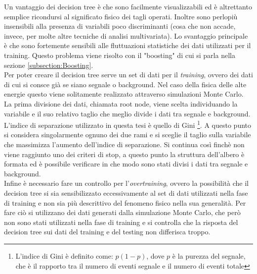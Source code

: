     Un vantaggio dei decision tree è che sono facilmente visualizzabili ed è altrettanto semplice ricondursi al significato fisico dei tagli operati. Inoltre sono perlopiù insensibili alla presenza di variabili poco discriminanti (cosa che non accade, invece, per molte altre tecniche di analisi multivariata). Lo svantaggio principale è che sono fortemente sensibili alle fluttuazioni statistiche dei dati utilizzati per il training. Questo problema viene risolto con il "boosting" di cui si parla nella sezione \ref{subsection:Boosting}.
    \\Per poter creare il decision tree serve un set di dati per il \textit{training}, ovvero dei dati di cui si consce già se siano segnale o background. Nel caso della fisica delle alte energie questo viene solitamente realizzato attraverso simulazioni Monte Carlo. La prima divisione dei dati, chiamata root node, viene scelta individuando la variabile e il suo relativo taglio che meglio divide i dati tra segnale e background. L'indice di separazione utilizzato in questa tesi è quello di Gini \footnote{L'indice di Gini è definito come: $p (1-p)$, dove $p$ è la purezza del segnale, che è il rapporto tra il numero di eventi segnale e il numero di eventi totale}. A questo punto si considera singolarmente ognuno dei due rami e si sceglie il taglio sulla variabile che massimizza l'aumento dell'indice di separazione. Si continua così finchè non viene raggiunto uno dei criteri di stop,  a questo punto la struttura dell'albero è formata ed è possibile verificare in che modo sono stati divisi i dati tra segnale e background. 
    \\Infine è necessario fare un controllo per l'\textit{overtraining}, ovvero la possibilità che il decision tree si sia sensibilizzato eccessivamente al set di dati utilizzati nella fase di training e non sia più descrittivo del fenomeno fisico nella sua generalità. Per fare ciò si utilizzano dei dati generati dalla simulazione Monte Carlo, che però non sono stati utilizzati nella fase di training e si controlla che la risposta del decision tree sui dati del training e del testing non differisca troppo.\cite{TMVAGuide} 
 
